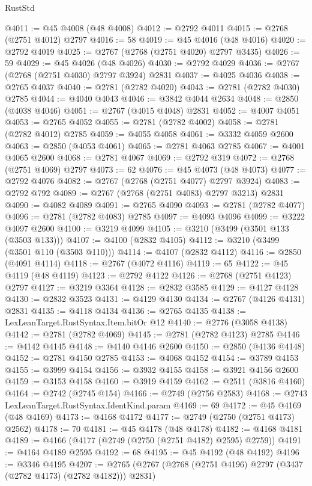 \begin{lexlean}{RustStd}
\begin{coremodule}
@4011 := @45 @4008 (@48 @4008)
@4012 := @2792 @4011
@4015 := @2768 (@2751 @4012) @2797
@4016 := 58
@4019 := @45 @4016 (@48 @4016)
@4020 := @2792 @4019
@4025 := @2767 (@2768 (@2751 @4020) @2797 @3435)
@4026 := 59
@4029 := @45 @4026 (@48 @4026)
@4030 := @2792 @4029
@4036 := @2767 (@2768 (@2751 @4030) @2797 @3924) @2831
@4037 := @4025 @4036
@4038 := @2765 @4037
@4040 := @2781 (@2782 @4020)
@4043 := @2781 (@2782 @4030) @2785
@4044 := @4040 @4043
@4046 := @3842 @4044 @2634
@4048 := @2850 (@4038 @4046)
@4051 := @2767 (@4015 @4048) @2831
@4052 := @4007 @4051
@4053 := @2765 @4052
@4055 := @2781 (@2782 @4002)
@4058 := @2781 (@2782 @4012) @2785
@4059 := @4055 @4058
@4061 := @3332 @4059 @2600
@4063 := @2850 (@4053 @4061)
@4065 := @2781 @4063 @2785
@4067 := @4001 @4065 @2600
@4068 := @2781 @4067
@4069 := @2792 @319
@4072 := @2768 (@2751 @4069) @2797
@4073 := 62
@4076 := @45 @4073 (@48 @4073)
@4077 := @2792 @4076
@4082 := @2767 (@2768 (@2751 @4077) @2797 @3924)
@4083 := @2792 @792
@4089 := @2767 (@2768 (@2751 @4083) @2797 @3213) @2831
@4090 := @4082 @4089
@4091 := @2765 @4090
@4093 := @2781 (@2782 @4077)
@4096 := @2781 (@2782 @4083) @2785
@4097 := @4093 @4096
@4099 := @3222 @4097 @2600
@4100 := @3219 @4099
@4105 := @3210 (@3499 (@3501 @133 (@3503 @133)))
@4107 := @4100 (@2832 @4105)
@4112 := @3210 (@3499 (@3501 @110 (@3503 @110)))
@4114 := @4107 (@2832 @4112)
@4116 := @2850 (@4091 @4114)
@4118 := @2767 (@4072 @4116)
@4119 := 65
@4122 := @45 @4119 (@48 @4119)
@4123 := @2792 @4122
@4126 := @2768 (@2751 @4123) @2797
@4127 := @3219 @3364
@4128 := @2832 @3585
@4129 := @4127 @4128
@4130 := @2832 @3523
@4131 := @4129 @4130
@4134 := @2767 (@4126 @4131) @2831
@4135 := @4118 @4134
@4136 := @2765 @4135
@4138 := LexLeanTarget.RustSyntax.Item.bitOr @12
@4140 := @2776 (@3058 @4138)
@4142 := @2781 (@2782 @4069)
@4145 := @2781 (@2782 @4123) @2785
@4146 := @4142 @4145
@4148 := @4140 @4146 @2600
@4150 := @2850 (@4136 @4148)
@4152 := @2781 @4150 @2785
@4153 := @4068 @4152
@4154 := @3789 @4153
@4155 := @3999 @4154
@4156 := @3932 @4155
@4158 := @3921 @4156 @2600
@4159 := @3153 @4158
@4160 := @3919 @4159
@4162 := @2511 (@3816 @4160)
@4164 := @2742 (@2745 @154)
@4166 := @2749 (@2756 @2583)
@4168 := @2743 LexLeanTarget.RustSyntax.IdentKind.param
@4169 := 69
@4172 := @45 @4169 (@48 @4169)
@4173 := @4168 @4172
@4177 := @2749 (@2750 (@2751 @4173) @2562)
@4178 := 70
@4181 := @45 @4178 (@48 @4178)
@4182 := @4168 @4181
@4189 := @4166 (@4177 (@2749 (@2750 (@2751 @4182) @2595) @2759))
@4191 := @4164 @4189 @2595
@4192 := 68
@4195 := @45 @4192 (@48 @4192)
@4196 := @3346 @4195
@4207 := @2765 (@2767 (@2768 (@2751 @4196) @2797 (@3437 (@2782 @4173) (@2782 @4182))) @2831)

\end{coremodule}
\end{lexlean}
